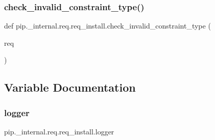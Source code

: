 \subsubsection{\texorpdfstring{check\+\_\+invalid\+\_\+constraint\+\_\+type()}{check\_invalid\_constraint\_type()}}
{\footnotesize\ttfamily def pip.\+\_\+internal.\+req.\+req\+\_\+install.\+check\+\_\+invalid\+\_\+constraint\+\_\+type (\begin{DoxyParamCaption}\item[{}]{req }\end{DoxyParamCaption})}



\subsection{Variable Documentation}
\mbox{\label{namespacepip_1_1__internal_1_1req_1_1req__install_a44cc981c8dfc9857ec9863043928af38}} 
\subsubsection{\texorpdfstring{logger}{logger}}
{\footnotesize\ttfamily pip.\+\_\+internal.\+req.\+req\+\_\+install.\+logger}

